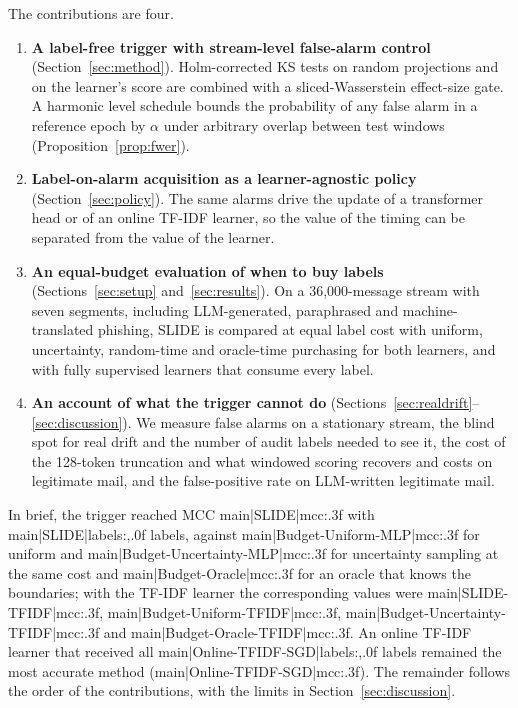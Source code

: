 The contributions are four.
\begin{enumerate}
\item \textbf{A label-free trigger with stream-level false-alarm control} (Section~\ref{sec:method}). Holm-corrected KS tests on random projections and on the learner's score are combined with a sliced-Wasserstein effect-size gate. A harmonic level schedule bounds the probability of any false alarm in a reference epoch by $\alpha$ under arbitrary overlap between test windows (Proposition~\ref{prop:fwer}).
\item \textbf{Label-on-alarm acquisition as a learner-agnostic policy} (Section~\ref{sec:policy}). The same alarms drive the update of a transformer head or of an online TF-IDF learner, so the value of the timing can be separated from the value of the learner.
\item \textbf{An equal-budget evaluation of when to buy labels} (Sections~\ref{sec:setup} and~\ref{sec:results}). On a 36{,}000-message stream with seven segments, including LLM-generated, paraphrased and machine-translated phishing, SLIDE is compared at equal label cost with uniform, uncertainty, random-time and oracle-time purchasing for both learners, and with fully supervised learners that consume every label.
\item \textbf{An account of what the trigger cannot do} (Sections~\ref{sec:realdrift}--\ref{sec:discussion}). We measure false alarms on a stationary stream, the blind spot for real drift and the number of audit labels needed to see it, the cost of the 128-token truncation and what windowed scoring recovers and costs on legitimate mail, and the false-positive rate on LLM-written legitimate mail.
\end{enumerate}

In brief, the trigger reached MCC {{main|SLIDE|mcc:.3f}} with {{main|SLIDE|labels:,.0f}} labels, against {{main|Budget-Uniform-MLP|mcc:.3f}} for uniform and {{main|Budget-Uncertainty-MLP|mcc:.3f}} for uncertainty sampling at the same cost and {{main|Budget-Oracle|mcc:.3f}} for an oracle that knows the boundaries; with the TF-IDF learner the corresponding values were {{main|SLIDE-TFIDF|mcc:.3f}}, {{main|Budget-Uniform-TFIDF|mcc:.3f}}, {{main|Budget-Uncertainty-TFIDF|mcc:.3f}} and {{main|Budget-Oracle-TFIDF|mcc:.3f}}. An online TF-IDF learner that received all {{main|Online-TFIDF-SGD|labels:,.0f}} labels remained the most accurate method ({{main|Online-TFIDF-SGD|mcc:.3f}}). The remainder follows the order of the contributions, with the limits in Section~\ref{sec:discussion}.
